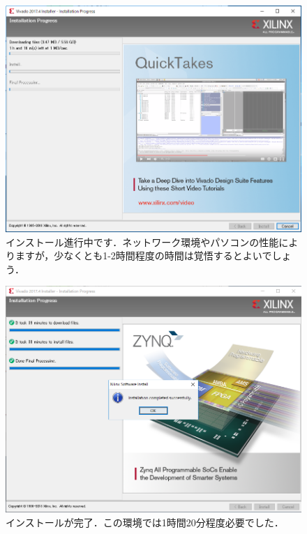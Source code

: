 \documentclass[a4paper,dvipdfmx]{jsarticle}
\begin{document}
 \begin{figure}[H]
  \begin{center}
   \includegraphics[width=.8\textwidth]{appendix_figures/15_installer_main.png}
   \caption{インストール進行中です．ネットワーク環境やパソコンの性能によりますが，少なくとも1-2時間程度の時間は覚悟するとよいでしょう．}
  \end{center}
 \end{figure}

 \begin{figure}[H]
  \begin{center}
   \includegraphics[width=.8\textwidth]{appendix_figures/16_installer_main.png}
   \caption{インストールが完了．この環境では1時間20分程度必要でした．}
  \end{center}
 \end{figure}
\end{document}
